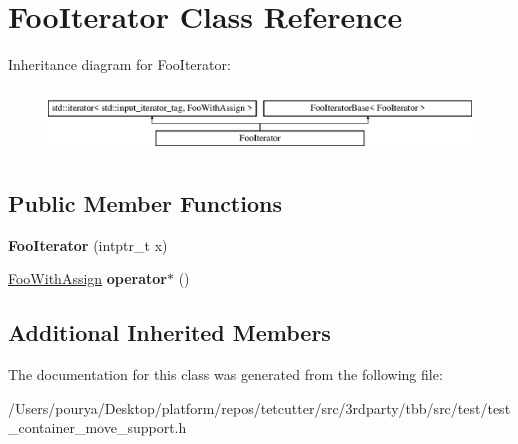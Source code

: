 \hypertarget{classFooIterator}{}\section{Foo\+Iterator Class Reference}
\label{classFooIterator}
Inheritance diagram for Foo\+Iterator\+:\begin{figure}[H]
\begin{center}
\leavevmode
\includegraphics[height=1.755486cm]{classFooIterator}
\end{center}
\end{figure}
\subsection*{Public Member Functions}
\begin{DoxyCompactItemize}
\item 
\hypertarget{classFooIterator_a1ae3a6f65920fd9620da6f6c6bca4d8c}{}{\bfseries Foo\+Iterator} (intptr\+\_\+t x)\label{classFooIterator_a1ae3a6f65920fd9620da6f6c6bca4d8c}

\item 
\hypertarget{classFooIterator_a4d7a65e2d8b2835d459e15ad3770c8ed}{}\hyperlink{classFooWithAssign}{Foo\+With\+Assign} {\bfseries operator$\ast$} ()\label{classFooIterator_a4d7a65e2d8b2835d459e15ad3770c8ed}

\end{DoxyCompactItemize}
\subsection*{Additional Inherited Members}


The documentation for this class was generated from the following file\+:\begin{DoxyCompactItemize}
\item 
/\+Users/pourya/\+Desktop/platform/repos/tetcutter/src/3rdparty/tbb/src/test/test\+\_\+container\+\_\+move\+\_\+support.\+h\end{DoxyCompactItemize}
